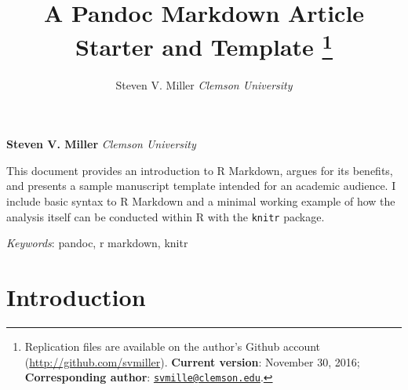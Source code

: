 \documentclass[11pt,]{article}
\title{A Pandoc Markdown Article Starter and Template \thanks{Replication files are available on the author's Github account
(\url{http://github.com/svmiller}). \textbf{Current version}: November
30, 2016; \textbf{Corresponding author}:
\href{mailto:svmille@clemson.edu}{\nolinkurl{svmille@clemson.edu}}.}  }
\author{\Large Steven V. Miller\vspace{0.05in} \newline\normalsize\emph{Clemson University}  }
\date{}
\newcommand*{\authorfont}{\fontfamily{phv}\selectfont}
\renewenvironment{abstract}
 {{%
    \setlength{\leftmargin}{0mm}
    \setlength{\rightmargin}{\leftmargin}%
  }%
  \relax}
 {\endlist}
\begin{document}
	
%

{%
\setlength{\parindent}{0pt}
\thispagestyle{plain}
{\fontsize{18}{20}\selectfont\raggedright 
\maketitle  %

}

{
   \vskip 13.5pt\relax \normalsize\fontsize{11}{12} 
\textbf{\authorfont Steven V. Miller} \hskip 15pt \emph{\small Clemson University}   

}

}







\begin{abstract}

    \hbox{\vrule height .2pt width 39.14pc}

    \vskip 8.5pt %

\noindent This document provides an introduction to R Markdown, argues for its
benefits, and presents a sample manuscript template intended for an
academic audience. I include basic syntax to R Markdown and a minimal
working example of how the analysis itself can be conducted within R
with the \texttt{knitr} package.


\vskip 8.5pt \noindent \emph{Keywords}: pandoc, r markdown, knitr \par

    \hbox{\vrule height .2pt width 39.14pc}



\end{abstract}


\vskip 6.5pt

\noindent  \section{Introduction}\label{introduction}
\end{document}
